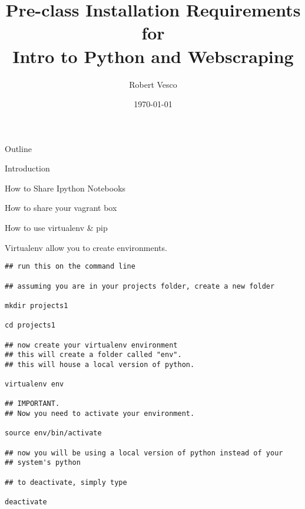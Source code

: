 \documentclass[presentation,smaller]{beamer}
\author{Robert Vesco}
\date{\today}
\title{Pre-class Installation Requirements for \\ Intro to Python and Webscraping}
\begin{document}
\maketitle
\begin{frame}{Outline}
\tableofcontents
\end{frame}


\begin{frame}[label=sec-1]{Introduction}
\end{frame}


\begin{frame}[label=sec-2]{How to Share Ipython Notebooks}
\end{frame}


\begin{frame}[label=sec-3]{How to share your vagrant box}
\end{frame}


\begin{frame}[fragile,label=sec-4]{How to use virtualenv \& pip}

 Virtualenv allow you to create environments. 

\lstset{numbers=left,language=sh}
\begin{lstlisting}
## run this on the command line

## assuming you are in your projects folder, create a new folder

mkdir projects1 

cd projects1

## now create your virtualenv environment
## this will create a folder called "env". 
## this will house a local version of python. 

virtualenv env 

## IMPORTANT. 
## Now you need to activate your environment. 

source env/bin/activate

## now you will be using a local version of python instead of your
## system's python

## to deactivate, simply type

deactivate
\end{lstlisting}
\end{frame}
\end{document}
